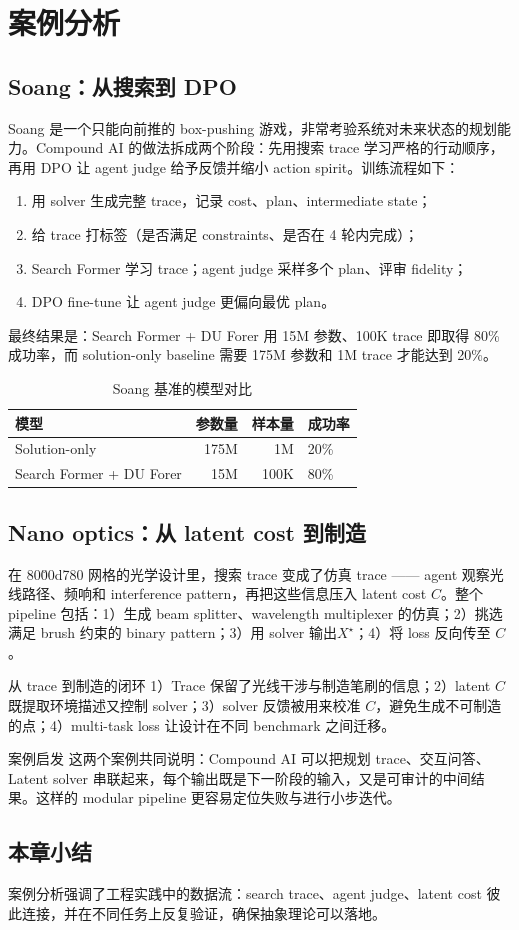 \section{案例分析}

\subsection{Soang：从搜索到 DPO}

Soang 是一个只能向前推的 box-pushing 游戏，非常考验系统对未来状态的规划能力。Compound AI 的做法拆成两个阶段：先用搜索 trace 学习严格的行动顺序，再用 DPO 让 agent judge 给予反馈并缩小 action spirit。训练流程如下：
\begin{enumerate}
    \item 用 solver 生成完整 trace，记录 cost、plan、intermediate state；
    \item 给 trace 打标签（是否满足 constraints、是否在 4 轮内完成）；
    \item Search Former 学习 trace；agent judge 采样多个 plan、评审 fidelity；
    \item DPO fine-tune 让 agent judge 更偏向最优 plan。
\end{enumerate}
最终结果是：Search Former + DU Forer 用 15M 参数、100K trace 即取得 80\% 成功率，而 solution-only baseline 需要 175M 参数和 1M trace 才能达到 20\%。
\begin{table}[H]
\centering
\begin{tabular}{lrrl}
\toprule
模型 & 参数量 & 样本量 & 成功率 \\
\midrule
Solution-only & 175M & 1M & 20\% \\
Search Former + DU Forer & 15M & 100K & 80\% \\
\bottomrule
\end{tabular}
\caption{Soang 基准的模型对比}
\end{table}

\subsection{Nano optics：从 latent cost 到制造}

在 80\u00d780 网格的光学设计里，搜索 trace 变成了仿真 trace —— agent 观察光线路径、频响和 interference pattern，再把这些信息压入 latent cost \(C\)。整个 pipeline 包括：1）生成 beam splitter、wavelength multiplexer 的仿真；2）挑选满足 brush 约束的 binary pattern；3）用 solver 输出\(X^\star\)；4）将 loss 反向传至 \(C\)。
\begin{importantbox}{从 trace 到制造的闭环}
1）Trace 保留了光线干涉与制造笔刷的信息；2）latent \(C\) 既提取环境描述又控制 solver；3）solver 反馈被用来校准 \(C\)，避免生成不可制造的点；4）multi-task loss 让设计在不同 benchmark 之间迁移。
\end{importantbox}
\begin{knowledgebox}{案例启发}
这两个案例共同说明：Compound AI 可以把规划 trace、交互问答、Latent solver 串联起来，每个输出既是下一阶段的输入，又是可审计的中间结果。这样的 modular pipeline 更容易定位失败与进行小步迭代。
\end{knowledgebox}

\subsection{本章小结}

案例分析强调了工程实践中的数据流：search trace、agent judge、latent cost 彼此连接，并在不同任务上反复验证，确保抽象理论可以落地。

